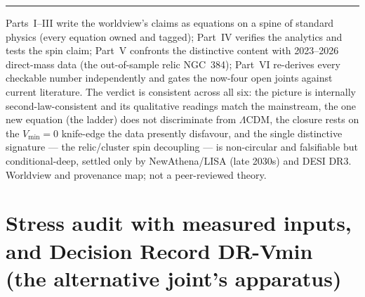 \documentclass[11pt]{article}
\begin{document}
\vspace{6pt}\hrule\vspace{4pt}
{\small Parts~I--III write the worldview's claims as equations on a spine of standard physics (every equation owned and tagged); Part~IV verifies the analytics and tests the spin claim; Part~V confronts the distinctive content with 2023--2026 direct-mass data (the out-of-sample relic NGC~384); Part~VI re-derives every checkable number independently and gates the now-four open joints against current literature. The verdict is consistent across all six: the picture is internally second-law-consistent and its qualitative readings match the mainstream, the one new equation (the ladder) does not discriminate from $\Lambda$CDM, the closure rests on the $V_{\min}=0$ knife-edge the data presently disfavour, and the single distinctive signature --- the relic/cluster spin decoupling --- is non-circular and falsifiable but conditional-deep, settled only by NewAthena/LISA (late 2030s) and DESI DR3. Worldview and provenance map; not a peer-reviewed theory.}


\clearpage

\part{Stress audit with measured inputs, and Decision Record DR-Vmin (the alternative joint's apparatus)}
\setcounter{section}{0}\setcounter{equation}{0}\setcounter{figure}{0}

\begin{center}\end{center}
\end{document}
